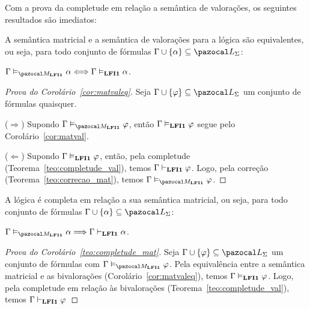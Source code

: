         Com a prova da completude em relação a semântica de valorações, os seguintes resultados são imediatos:

        \begin{corolario}\label{cor:matvaleq}
            A semântica matricial e a semântica de valorações para a lógica {\normalfont\lfium{}} são equivalentes, ou seja, para todo conjunto de fórmulas $\Gamma \cup \{\alpha\} \subseteq \ling{}$:

            \centering
            {\normalfont{} $\Gamma \conmat \alpha \Longleftrightarrow \Gamma \conval \alpha$.}

        \end{corolario}

        \begin{proof}[Prova do Corolário~\ref{cor:matvaleq}]
            Seja $\Gamma \cup \{\phi\} \subseteq \ling{}$ um conjunto de fórmulas quaisquer.

            \noindent ($\Longrightarrow$) Supondo $\Gamma \conmat \phi$, então $\Gamma \vDash_{{\normalfont\textbf{LFI1}}{}} \varphi$ segue pelo Corolário~\ref{cor:matval}.

            \noindent ($\Longleftarrow$) Supondo $\Gamma \vDash_{{\normalfont\textbf{LFI1}}{}} \varphi$, então, pela completude (Teorema~\ref{teo:completude_val}), temos $\Gamma \vdash_{{\normalfont\textbf{LFI1}}{}} \varphi$. Logo, pela correção (Teorema~\ref{teo:correcao_mat}), temos $\Gamma \conmat \phi$.

        \end{proof}



        \begin{corolario}\label{teo:completude_mat}
            A lógica {\normalfont\lfium{}} é completa em relação a sua semântica matricial, ou seja, para todo conjunto de fórmulas $\Gamma \cup \{\alpha\} \subseteq \ling{}$:

            \centering
            {\normalfont{} $\Gamma \conmat \alpha \Longrightarrow \Gamma \conhil \alpha$.}

        \end{corolario}

        \begin{proof}[Prova do Corolário~\ref{teo:completude_mat}]
            Seja $\Gamma \cup \{\phi\} \subseteq \ling{}$ um conjunto de fórmulas com $\Gamma \conmat \phi$. Pela equivalência entre a semântica matricial e as bivalorações (Corolário~\ref{cor:matvaleq}), temos $\Gamma \vDash_{{\normalfont\textbf{LFI1}}{}} \varphi$. Logo, pela completude em relação às bivalorações (Teorema~\ref{teo:completude_val}), temos $\Gamma \vdash_{{\normalfont\textbf{LFI1}}{}} \varphi$
        \end{proof}